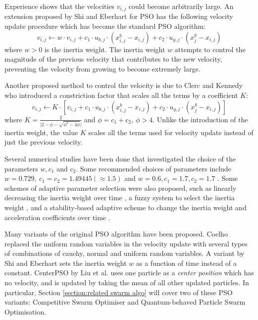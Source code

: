 \documentclass[12pt]{article}
\theoremstyle{definition}
\begin{document}
Experience shows that the velocities $v_{i,j}$ could become arbitrarily large. An extension proposed by Shi and Eberhart \cite{shieberhart1998} for PSO has the following velocity update procedure which has become the standard PSO algorithm:
$$v_{i,j} \leftarrow w \cdot v_{i,j} + c_1 \cdot u_{b,j} \cdot  (x^b_{i,j} - x_{i,j}) +  c_2 \cdot u_{g,j} \cdot (x^g_j - x_{i,j})$$
where $w > 0$ is the inertia weight. The inertia weight $w$ attempts to control the magnitude of the previous velocity that contributes to the new velocity, preventing the velocity from growing to become extremely large. \newline

Another proposed method to control the velocity is due to Clerc and Kennedy \cite{Clerc2002ThePS, eberhartshi2000} who introduced a constriction factor that scales all the terms by a coefficient $K$:
$$v_{i,j} \leftarrow K \cdot \left[ v_{i,j} + c_1 \cdot u_{b,j} \cdot  (x^b_{i,j} - x_{i,j}) +  c_2 \cdot u_{g,j} \cdot (x^g_j - x_{i,j}) \right]$$
where $K = \frac{2}{\lvert 2 - \phi - \sqrt{\phi^2 - 4\phi} \rvert}$ and $\phi = c_1 + c_2, \ \phi > 4$. Unlike the introduction of the inertia weight, the value $K$ scales all the terms used for velocity update instead of just the previous velocity. \newline

Several numerical studies have been done that investigated the choice of the parameters $w, c_1$ and $c_2$. Some recommended choices of parameters include $w = 0.729, \ c_1 = c_2 = 1.49445 (\approx 1.5)$ \cite{eberhartshi2000} and $w = 0.6, c_1 = 1.7, c_2 = 1.7$ \cite{TRELEA2003317}. Some schemes of adaptive parameter selection were also proposed, such as linearly decreasing the inertia weight over time \cite{10.1007/BFb0040810}, a fuzzy system to select the inertia weight \cite{shieberhart2001}, and a stability-based adaptive scheme to change the inertia weight and acceleration coefficients over time \cite{TAHERKHANI2016281}. \newline

Many variants of the original PSO algorithm have been proposed. Coelho \cite{10.1007/3-540-32400-3_22} replaced the uniform random variables in the velocity update with several types of combinations of cauchy, normal and uniform random variables. A variant by Shi and Eberhart \cite{shieberhart1998} sets the inertia weight $w$ as a function of time instead of a constant. CenterPSO by Liu et al. \cite{LIU2007672} uses one particle as a \textit{center position} which has no velocity, and is updated by taking the mean of all other updated particles. In particular, Section \ref{section:related swarm algo} will cover two of these PSO variants: Competitive Swarm Optimiser and Quantum-behaved Particle Swarm Optimisation.
\end{document}
